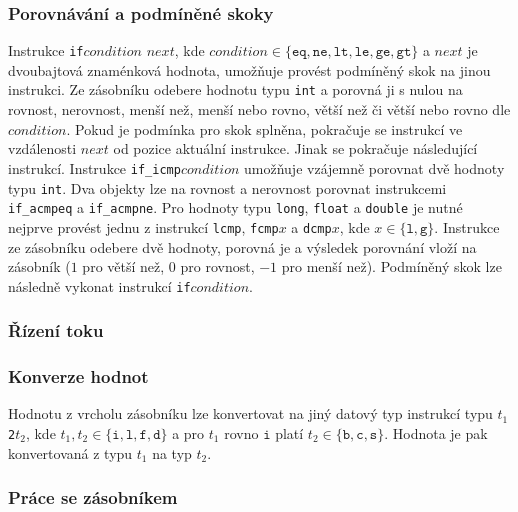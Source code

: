 \subsubsection{Porovnávání a podmíněné skoky}


Instrukce \texttt{if}$condition$ $next$, kde $condition \in \{ \texttt{eq}, \texttt{ne}, \texttt{lt}, \texttt{le}, \texttt{ge}, \texttt{gt}\}$ a $next$ je dvoubajtová znaménková hodnota, umožňuje provést podmíněný skok na jinou instrukci. Ze zásobníku odebere hodnotu typu \texttt{int} a porovná ji s nulou na rovnost, nerovnost, menší než, menší nebo rovno, větší než či větší nebo rovno dle $condition$. Pokud je podmínka pro skok splněna, pokračuje se instrukcí ve vzdálenosti $next$ od pozice aktuální instrukce. Jinak se pokračuje následující instrukcí. Instrukce \texttt{if\_icmp}$condition$ umožňuje vzájemně porovnat dvě hodnoty typu \texttt{int}. Dva objekty lze na rovnost a nerovnost porovnat instrukcemi \texttt{if\_acmpeq} a \texttt{if\_acmpne}. Pro hodnoty typu \texttt{long}, \texttt{float} a \texttt{double} je nutné nejprve provést jednu z instrukcí \texttt{lcmp}, \texttt{fcmp}$x$ a \texttt{dcmp}$x$, kde $x \in \{\texttt{l}, \texttt{g} \}$. Instrukce ze zásobníku odebere dvě hodnoty, porovná je a výsledek porovnání vloží na zásobník ($1$ pro větší než, $0$ pro rovnost, $-1$ pro menší než). Podmíněný skok lze následně vykonat instrukcí \texttt{if}$condition$.


\subsubsection {Řízení toku}


\subsubsection{Konverze hodnot}

Hodnotu z vrcholu zásobníku lze konvertovat na jiný datový typ instrukcí typu $t_1$\texttt{2}$t_2$, kde $t_1, t_2 \in \{\texttt{i}, \texttt{l},\texttt{f},\texttt{d}\}$ a pro $t_1$ rovno $\texttt{i}$ platí $t_2 \in \{\texttt{b}, \texttt{c},\texttt{s}\}$. Hodnota je pak konvertovaná z typu $t_1$ na typ $t_2$.

\subsubsection{Práce se zásobníkem}

